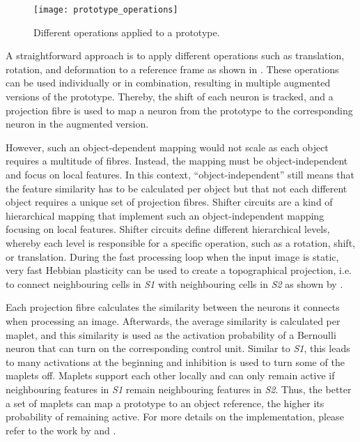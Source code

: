 \begin{figure}[h]
    \centering
    \texttt{[image: prototype\_operations]}
    \caption[Operations applied to a prototype]{Different operations applied to a prototype.}
\end{figure}
A straightforward approach is to apply different operations such as translation, rotation, and deformation to a reference frame as shown in . These operations can be used individually or in combination, resulting in multiple augmented versions of the prototype.
Thereby, the shift of each neuron is tracked, and a projection fibre is used to map a neuron from the prototype to the corresponding neuron in the augmented version.

However, such an object-dependent mapping would not scale as each object requires a multitude of fibres.
Instead, the mapping must be object-independent and focus on local features.
In this context, ``object-independent'' still means that the feature similarity has to be calculated per object but that not each different object requires a unique set of projection fibres.
Shifter circuits  are a kind of hierarchical mapping that implement such an object-independent mapping focusing on local features.
Shifter circuits define different hierarchical levels, whereby each level is responsible for a specific operation, such as a rotation, shift, or translation.
During the fast processing loop when the input image is static, very fast Hebbian plasticity can be used to create a topographical projection, i.e. to connect neighbouring cells in \emph{S1} with neighbouring cells in \emph{S2} as shown by .

Each projection fibre calculates the similarity between the neurons it connects when processing an image.
Afterwards, the average similarity is calculated per maplet, and this similarity is used as the activation probability of a Bernoulli neuron that can turn on the corresponding control unit.
Similar to \emph{S1}, this leads to many activations at the beginning and inhibition is used to turn some of the maplets off.
Maplets support each other locally and can only remain active if neighbouring features in \emph{S1} remain neighbouring features in \emph{S2}.
Thus, the better a set of maplets can map a prototype to an object reference, the higher its probability of remaining active.
For more details on the implementation, please refer to the work by  and .


